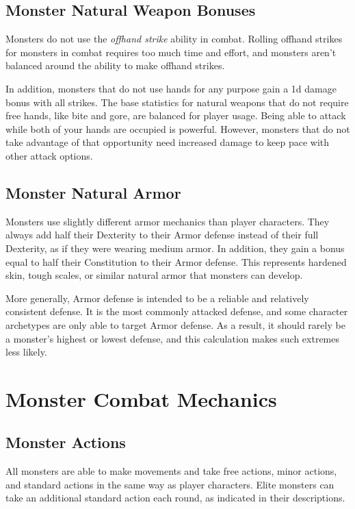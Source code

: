     \subsection{Monster Natural Weapon Bonuses}\label{Monster Natural Weapon Bonuses}
        Monsters do not use the \textit{offhand strike} ability in combat.
        Rolling offhand strikes for monsters in combat requires too much time and effort, and monsters aren't balanced around the ability to make offhand strikes.

        In addition, monsters that do not use hands for any purpose gain a \plus1d damage bonus with all strikes.
        The base statistics for natural weapons that do not require free hands, like bite and gore, are balanced for player usage.
        Being able to attack while both of your hands are occupied is powerful.
        However, monsters that do not take advantage of that opportunity need increased damage to keep pace with other attack options.

    \subsection{Monster Natural Armor}\label{Monster Natural Armor}
        Monsters use slightly different armor mechanics than player characters.
        They always add half their Dexterity to their Armor defense instead of their full Dexterity, as if they were wearing medium armor.
        In addition, they gain a bonus equal to half their Constitution to their Armor defense.
        This represents hardened skin, tough scales, or similar natural armor that monsters can develop.

        More generally, Armor defense is intended to be a reliable and relatively consistent defense.
        It is the most commonly attacked defense, and some character archetypes are only able to target Armor defense.
        As a result, it should rarely be a monster's highest or lowest defense, and this calculation makes such extremes less likely.

\section{Monster Combat Mechanics}

    \subsection{Monster Actions}\label{Monster Actions}
        All monsters are able to make movements and take free actions, minor actions, and standard actions in the same way as player characters.
        Elite monsters can take an additional standard action each round, as indicated in their descriptions.

